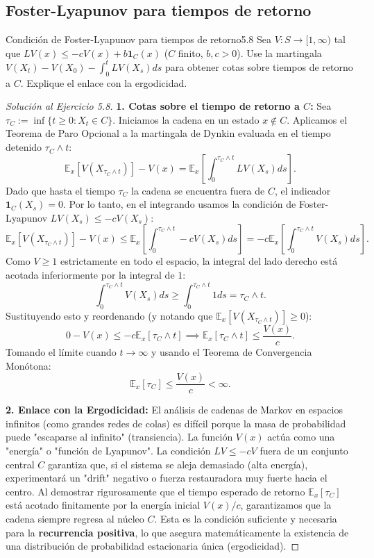 \documentclass[10pt,a4paper]{article}
\begin{document}
\newpage
\subsection{Foster-Lyapunov para tiempos de retorno}

\begin{ejercicio}{Condición de Foster-Lyapunov para tiempos de retorno}{5.8}
    Sea $V: S \to [1, \infty)$ tal que $LV(x) \le -cV(x) + b \mathbf{1}_C(x)$ ($C$ finito, $b, c > 0$). Use la martingala $V(X_t) - V(X_0) - \int_0^t LV(X_s)ds$ para obtener cotas sobre tiempos de retorno a $C$. Explique el enlace con la ergodicidad.
\end{ejercicio}

\begin{proof}[Solución al Ejercicio 5.8]
    \textbf{1. Cotas sobre el tiempo de retorno a $C$:}
    Sea $\tau_C := \inf\{t \ge 0 : X_t \in C\}$. Iniciamos la cadena en un estado $x \notin C$. 
    Aplicamos el Teorema de Paro Opcional a la martingala de Dynkin evaluada en el tiempo detenido $\tau_C \wedge t$:
    \[ \mathbb{E}_x[V(X_{\tau_C \wedge t})] - V(x) = \mathbb{E}_x \left[ \int_0^{\tau_C \wedge t} LV(X_s) ds \right]. \]
    Dado que hasta el tiempo $\tau_C$ la cadena se encuentra fuera de $C$, el indicador $\mathbf{1}_C(X_s) = 0$. Por lo tanto, en el integrando usamos la condición de Foster-Lyapunov $LV(X_s) \le -cV(X_s)$:
    \[ \mathbb{E}_x[V(X_{\tau_C \wedge t})] - V(x) \le \mathbb{E}_x \left[ \int_0^{\tau_C \wedge t} -c V(X_s) ds \right] = -c \mathbb{E}_x \left[ \int_0^{\tau_C \wedge t} V(X_s) ds \right]. \]
    Como $V \ge 1$ estrictamente en todo el espacio, la integral del lado derecho está acotada inferiormente por la integral de $1$:
    \[ \int_0^{\tau_C \wedge t} V(X_s) ds \ge \int_0^{\tau_C \wedge t} 1 ds = \tau_C \wedge t. \]
    Sustituyendo esto y reordenando (y notando que $\mathbb{E}_x[V(X_{\tau_C \wedge t})] \ge 0$):
    \[ 0 - V(x) \le -c \mathbb{E}_x[\tau_C \wedge t] \implies \mathbb{E}_x[\tau_C \wedge t] \le \frac{V(x)}{c}. \]
    Tomando el límite cuando $t \to \infty$ y usando el Teorema de Convergencia Monótona:
    \[ \mathbb{E}_x[\tau_C] \le \frac{V(x)}{c} < \infty. \]

    \textbf{2. Enlace con la Ergodicidad:}
    El análisis de cadenas de Markov en espacios infinitos (como grandes redes de colas) es difícil porque la masa de probabilidad puede "escaparse al infinito" (transiencia).
    La función $V(x)$ actúa como una "energía" o "función de Lyapunov". La condición $LV \le -cV$ fuera de un conjunto central $C$ garantiza que, si el sistema se aleja demasiado (alta energía), experimentará un "drift" negativo o fuerza restauradora muy fuerte hacia el centro. 
    Al demostrar rigurosamente que el tiempo esperado de retorno $\mathbb{E}_x[\tau_C]$ está acotado finitamente por la energía inicial $V(x)/c$, garantizamos que la cadena siempre regresa al núcleo $C$. Esta es la condición suficiente y necesaria para la \textbf{recurrencia positiva}, lo que asegura matemáticamente la existencia de una distribución de probabilidad estacionaria única (ergodicidad).
\end{proof}
\end{document}
